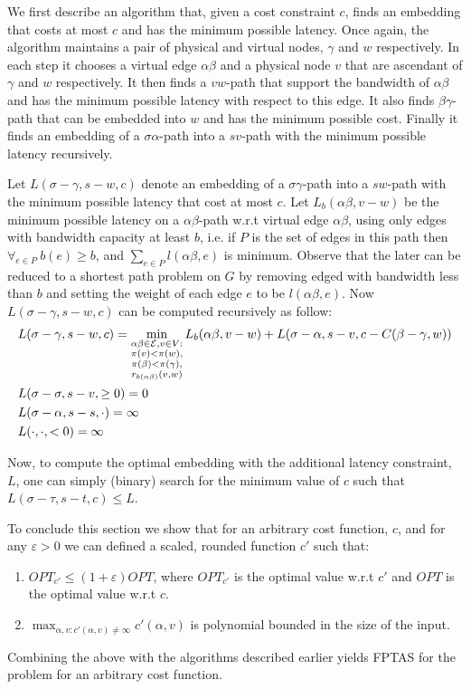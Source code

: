 We first describe an algorithm that, given a cost constraint $c$, 
finds an embedding that costs at most $c$ and has the minimum possible latency.
Once again, the algorithm maintains a pair of physical and virtual nodes,
$\gamma$ and $w$ respectively.
In each step it chooses a virtual edge $\alpha\beta$ and a physical node $v$
that are ascendant of $\gamma$ and $w$ respectively.
It then finds a $vw$-path that support the bandwidth of $\alpha\beta$ and
has the minimum possible latency with respect to this edge.
It also finds $\beta\gamma$-path that can be embedded into $w$ and has the 
minimum possible cost.
Finally it finds an embedding of a $\sigma\alpha$-path into a $sv$-path with 
the minimum possible latency recursively.

Let $L(\sigma-\gamma, s-w, c)$ denote an embedding of a $\sigma\gamma$-path
into a $sw$-path with the minimum possible latency that cost at most $c$.
Let $L_{b}(\alpha\beta, v-w)$ be the minimum possible latency on a $\alpha\beta$-path
w.r.t virtual edge $\alpha\beta$, using only edges with bandwidth capacity at least $b$,
i.e. if $P$ is the set of edges in this path then $\forall_{e \in P}~b(e) \geq b$,
and $\sum_{e \in P}l(\alpha\beta, e)$ is minimum.
Observe that the later can be reduced to a shortest path problem on $G$ by removing
edged with bandwidth less than $b$ and setting the weight of each edge $e$ to be 
$l(\alpha\beta, e)$.
Now $L(\sigma-\gamma, s-w, c)$ can be computed recursively as follow:
\begin{align*}
&L(\sigma-\gamma, s-w, c) = 
\min_{\substack{
\alpha\beta \in \mathcal{E},  
v \in V:
\\
\pi(v) < \pi(w),
\\
\pi(\beta ) < \pi(\gamma ), 
\\
r_{b(\alpha\beta)}(v,w)
}}
L_{b}(\alpha\beta, v-w) + 
L(\sigma-\alpha, s-v, c - C(\beta-\gamma, w))
\\
&L(\sigma-\sigma, s-v, \geq 0) = 0
\\
&L(\sigma-\alpha, s-s, \cdot) = \infty
\\
&L(\cdot, \cdot, <0) = \infty
\end{align*} 

Now, to compute the optimal embedding with the additional latency constraint,
$L$, one can simply (binary) search for the minimum value of $c$ such that
$L(\sigma-\tau, s-t, c) \leq L$.

To conclude this section we show that for an arbitrary cost function, $c$,
and for any $\varepsilon > 0$ 
we can defined a scaled, rounded function $c'$ such that:
\begin{enumerate}
\item $OPT_{c'} \leq (1 + \varepsilon)OPT$, where $OPT_{c'}$ is the optimal
value w.r.t $c'$ and $OPT$ is the optimal value w.r.t $c$.
\item $\max_{\alpha, v : c'(\alpha, v) \neq \infty}c'(\alpha, v)$ is polynomial
bounded in the size of the input.
\end{enumerate}
Combining the above with the algorithms described earlier 
yields FPTAS for the \VPN{} problem for an arbitrary cost function.

